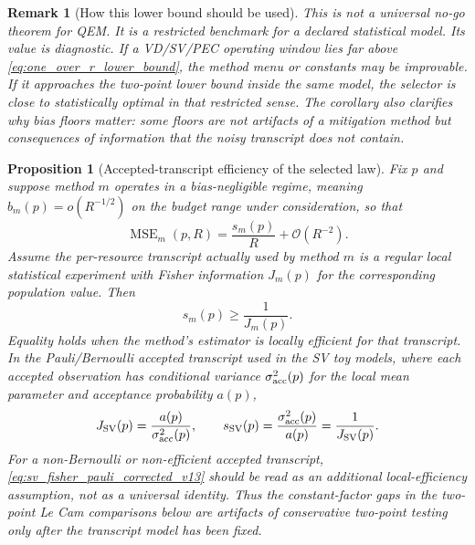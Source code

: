 \documentclass[11pt]{article}
\newtheorem{proposition}{Proposition}
\newtheorem{remark}{Remark}
\newcommand{\MSE}{\operatorname{MSE}}
\newcommand{\1}{\mathbf{1}}
\newcommand{\OO}{\mathcal{O}}
\begin{document}
\begin{remark}[How this lower bound should be used]
\label{rem:lower_bound_role}
This is not a universal no-go theorem for QEM\@.  It is a restricted benchmark for a declared statistical model.  Its value is diagnostic.  If a VD/SV/PEC operating window lies far above \cref{eq:one_over_r_lower_bound}, the method menu or constants may be improvable.  If it approaches the two-point lower bound inside the same model, the selector is close to statistically optimal in that restricted sense.  The corollary also clarifies why bias floors matter: some floors are not artifacts of a mitigation method but consequences of information that the noisy transcript does not contain.
\end{remark}



\begin{proposition}[Accepted-transcript efficiency of the selected law]
\label{prop:accepted_transcript_efficiency_v10}
Fix \(p\) and suppose method \(m\) operates in a bias-negligible regime, meaning
\(b_m(p)=o(R^{-1/2})\) on the budget range under consideration, so that
\begin{equation}
    \MSE_m(p,R)=\frac{s_m(p)}{R}+\OO(R^{-2}).
\end{equation}
Assume the per-resource transcript actually used by method \(m\) is a regular local statistical experiment with Fisher information \(J_m(p)\) for the corresponding population value.  Then
\begin{equation}
    s_m(p)\ge \frac{1}{J_m(p)}.
    \label{eq:transcript_crb_v10}
\end{equation}
Equality holds when the method's estimator is locally efficient for that transcript.  In the Pauli/Bernoulli accepted transcript used in the SV toy models, where each accepted observation has conditional variance \(\sigma_{\rm acc}^2(p)\) for the local mean parameter and acceptance probability \(a(p)\),
\begin{equation}
    J_{\rm SV}(p)=\frac{a(p)}{\sigma_{\rm acc}^2(p)},
    \qquad
    s_{\rm SV}(p)=\frac{\sigma_{\rm acc}^2(p)}{a(p)}=\frac{1}{J_{\rm SV}(p)}.
    \label{eq:sv_fisher_pauli_corrected_v13}
\end{equation}
For a non-Bernoulli or non-efficient accepted transcript, \cref{eq:sv_fisher_pauli_corrected_v13} should be read as an additional local-efficiency assumption, not as a universal identity.  Thus the constant-factor gaps in the two-point Le Cam comparisons below are artifacts of conservative two-point testing only after the transcript model has been fixed.
\end{proposition}
\end{document}
